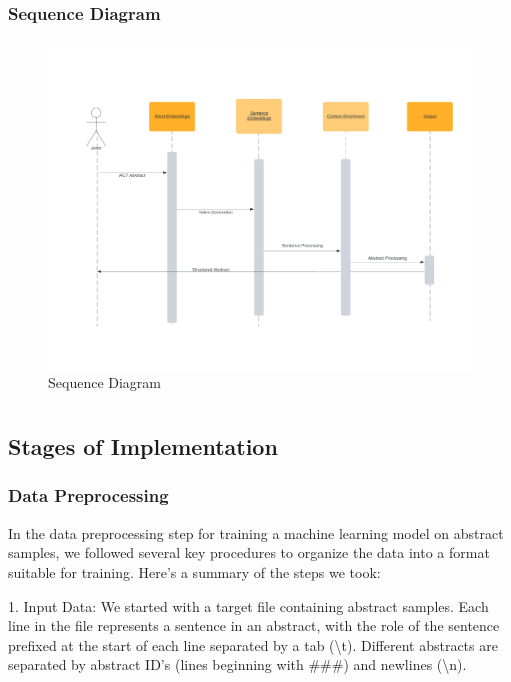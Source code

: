 \documentclass[12pt,a4paper]{report}     %
\begin{document}
\begin{normalsize}
{{\subsection{Sequence Diagram}
\begin{figure}[H]
    \centering
    \includegraphics[width=15cm]{Sequence diagram.png}
    \caption{Sequence Diagram}
    \label{fig: sequence diagram}
\end{figure}


}


\newpage 
\chapter{}
{\setlength{\baselineskip}{1.1\baselineskip}
\section{Stages of Implementation}

\subsection{Data Preprocessing}
In the data preprocessing step for training a machine learning model on abstract samples, we followed several key procedures to organize the data into a format suitable for training. Here's a summary of the steps we took:

1. Input Data: We started with a target file containing abstract samples. Each line in the file represents a sentence in an abstract, with the role of the sentence prefixed at the start of each line separated by a tab (\textbackslash t). Different abstracts are separated by abstract ID's (lines beginning with \#\#\#) and newlines (\textbackslash n).

}}
\end{normalsize}
\end{document}
